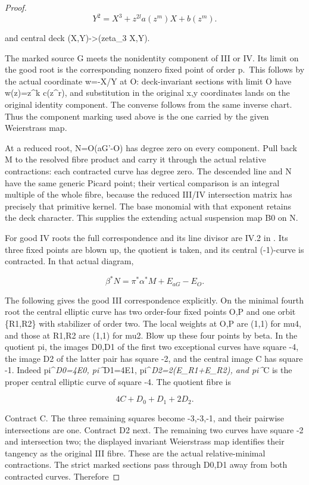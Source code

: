\begin{proof}
\[
Y^2=X^3+z^{2l}a(z^m)X+b(z^m).
\]

and central deck (X,Y)-\textgreater(zeta\_3 X,Y).

The marked source G meets the nonidentity component of III or IV.
Its limit on the good root is the corresponding nonzero fixed
point of order p.~This follows by the actual coordinate
w=-X/Y at O: deck-invariant sections with limit O have
w(z)=z\^{}k c(z\^{}r), and substitution in the original x,y coordinates
lands on the original identity component. The converse follows
from the same inverse chart. Thus the component marking used
above is the one carried by the given Weierstrass map.

At a reduced root, N=O(aG'-O) has degree zero on every component.
Pull back M to the resolved fibre product and carry it through
the actual relative contractions: each contracted curve has
degree zero. The descended line and N have the same generic
Picard point; their vertical comparison is an integral multiple
of the whole fibre, because the reduced III/IV intersection
matrix has precisely that primitive kernel. The base monomial
with that exponent retains the deck character. This supplies
the extending actual suspension map B0 on N.

For good IV roots the full correspondence and its line divisor
are IV.2 in . Its three fixed points
are blown up, the quotient is taken, and its central (-1)-curve
is contracted. In that actual diagram,

\[
\beta^*N=\pi^*\alpha^*M+E_{aG}-E_O.
\]

The following gives the good III correspondence explicitly.
On the minimal fourth root the central elliptic curve has two
order-four fixed points O,P and one orbit \{R1,R2\} with stabilizer
of order two. The local weights at O,P are (1,1) for mu4, and
those at R1,R2 are (1,1) for mu2. Blow up these four points by
beta. In the quotient pi, the images D0,D1 of the first two
exceptional curves have square -4, the image D2 of the latter
pair has square -2, and the central image C has square -1.
Indeed pi\^{}\emph{D0=4E0, pi\^{}}D1=4E1,
pi\^{}\emph{D2=2(E\_R1+E\_R2), and pi\^{}}C is the proper central elliptic
curve of square -4. The quotient fibre is

\[
4C+D_0+D_1+2D_2.
\]

Contract C. The three remaining squares become -3,-3,-1,
and their pairwise intersections are one. Contract D2 next.
The remaining two curves have square -2 and intersection two;
the displayed invariant Weierstrass map identifies their
tangency as the original III fibre. These are the actual
relative-minimal contractions. The strict marked sections pass
through D0,D1 away from both contracted curves. Therefore


\end{proof}
